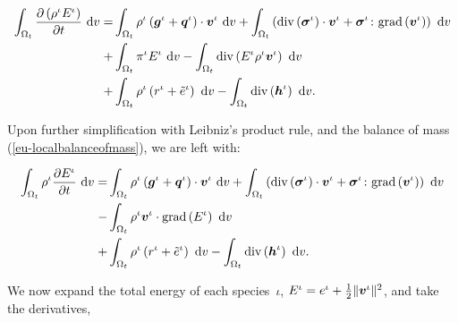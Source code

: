 \begin{equation*}
\begin{split}
\int_{\Omega_{t}}
\frac{\partial \left(\rho^{\iota}
E^{\iota}\right)}{\partial t}  \ \mathrm{d}v  = & \int_{\Omega_{t}}
  \rho^{\iota} \left(\mbox{\boldmath$ g$}^{\iota} +
  \mbox{\boldmath$ q$}^{\iota}\right)\cdot\mbox{\boldmath$ v$}^{\iota}\ \mathrm{d}v +
\int_{\Omega_{t}}
  \left(\mathrm{div}\left(\mbox{\boldmath$\sigma$}^{\iota}\right)\cdot\mbox{\boldmath$ v$}^{\iota} +
  \mbox{\boldmath$\sigma$}^{\iota}\colon\mathrm{grad}\left(\mbox{\boldmath$ v$}^{\iota}\right)
  \right)\ \mathrm{d}v\\ + 
& \int_{\Omega_{t}} \pi^{\iota}E^{\iota}\ \mathrm{d}v
- \int_{\Omega_{t}} \mathrm{div}\left(E^{\iota} \rho^{\iota}
\mbox{\boldmath$ v$}^{\iota}\right)\ \mathrm{d}v
\\  + &\int_{\Omega_{t}} \rho^{\iota} \left(r^{\iota} +
  \tilde{e}^{\iota} \right)\ \mathrm{d}v
- \int_{\Omega_{t}}
  \mathrm{div}\left(\mbox{\boldmath$ h$}^{\iota}\right)\ \mathrm{d}v.
\end{split}
\end{equation*}

\noindent Upon further simplification with Leibniz's product rule, and
the balance of mass (\ref{eu-localbalanceofmass}), we are left with:

\begin{equation*}
\begin{split}
\int_{\Omega_{t}}
\rho^{\iota} \frac{\partial E^{\iota}}{\partial t}\ \mathrm{d}v  = &
\int_{\Omega_{t}}
  \rho^{\iota} \left(\mbox{\boldmath$ g$}^{\iota} +
  \mbox{\boldmath$ q$}^{\iota}\right)\cdot\mbox{\boldmath$ v$}^{\iota}\ \mathrm{d}v +
\int_{\Omega_{t}}
  \left(\mathrm{div}\left(\mbox{\boldmath$\sigma$}^{\iota}\right)\cdot\mbox{\boldmath$ v$}^{\iota} +
  \mbox{\boldmath$\sigma$}^{\iota}\colon\mathrm{grad}\left(\mbox{\boldmath$ v$}^{\iota}\right)
  \right)\ \mathrm{d}v\\ 
 - & \int_{\Omega_{t}} \rho^{\iota}\mbox{\boldmath$ v$}^{\iota}
\cdot \mathrm{grad}\left( E^{\iota} \right)\ \mathrm{d}v
\\  + &\int_{\Omega_{t}} \rho^{\iota} \left(r^{\iota} +
  \tilde{e}^{\iota} \right)\ \mathrm{d}v
- \int_{\Omega_{t}}
  \mathrm{div}\left(\mbox{\boldmath$ h$}^{\iota}\right)\ \mathrm{d}v.
\end{split}
\end{equation*}

We now expand the total energy of each species~$\iota$, $E^{\iota} =
e^\iota + \frac{1}{2} \Vert\mbox{\boldmath$ v$}^\iota\Vert^2$, and take the
derivatives,

